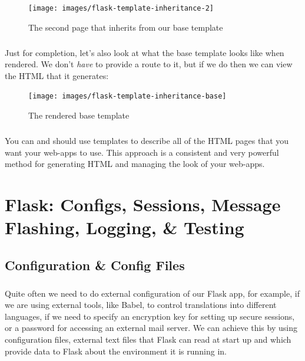 \documentclass[12pt, a4paper, oneside]{book}
\begin{document}
{\begin{figure}[H]
\centering
\texttt{[image: images/flask-template-inheritance-2]}
\caption{The second page that inherits from our base template}
\label{fig:flask-template-inheritance-2}
\end{figure}

\paragraph{} Just for completion, let's also look at what the base template looks like when rendered. We don't \emph{have} to provide a route to it, but if we do then we can view the HTML that it generates:

\begin{figure}[H]
\centering
\texttt{[image: images/flask-template-inheritance-base]}
\caption{The rendered base template}
\label{fig:flask-template-inheritance-base}
\end{figure}

\paragraph{} You can and should use templates to describe all of the HTML pages that you want your web-apps to use. This approach is a consistent and very powerful method for generating HTML and managing the look of your web-apps.


\chapter{Flask: Configs, Sessions, Message Flashing, Logging, \& Testing}
\label{lab06}
\paragraph{} 

\section{Configuration \& Config Files}
\label{configs}
\paragraph{} Quite often we need to do external configuration of our Flask app, for example, if we are using external tools, like Babel, to control translations into different languages, if we need to specify an encryption key for setting up secure sessions, or a password for accessing an external mail server. We can achieve this by using configuration files, external text files that Flask can read at start up and which provide data to Flask about the environment it is running in.

}
\end{document}
